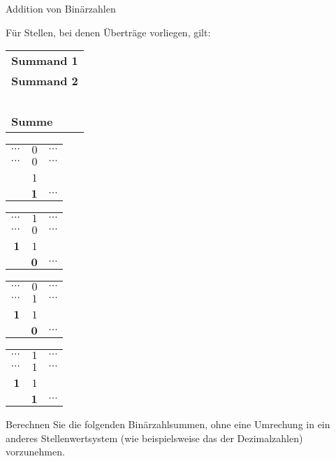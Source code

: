 \begin{exercise}{Addition von Binärzahlen}
\begin{body}
\medskip
Für Stellen, bei denen Überträge vorliegen, gilt:
\medskip
\begin{center}
\begin{tabular}{l}
\textbf{Summand 1} \\
\textbf{Summand 2} \\
{\footnotesize\ } \\
\textbf{Summe}
\end{tabular}
\hspace{2em}
\begin{tabular}{rrr}
$\dotsb$     & $0$          & $\dotsb$   \\
$\dotsb$     & $0$          & $\dotsb$   \\
{\footnotesize\ }   & {\footnotesize $1$} & {\footnotesize\ } \\
\hline
             & $\boldsymbol{1}$ & $\dotsb$
\end{tabular}
\hspace{1.5em}
\begin{tabular}{rrr}
$\dotsb$     & $1$ & $\dotsb$  \\
$\dotsb$     & $0$ & $\dotsb$  \\
{\footnotesize $\boldsymbol{1}$} & {\footnotesize $1$} & {\footnotesize\ } \\
\hline
             & $\boldsymbol{0}$ & $\dotsb$
\end{tabular}
\hspace{1.5em}
\begin{tabular}{rrr}
$\dotsb$     & $0$          & $\dotsb$  \\
$\dotsb$     & $1$          & $\dotsb$  \\
{\footnotesize $\boldsymbol{1}$} & {\footnotesize $1$} & {\footnotesize\ } \\
\hline
             & $\boldsymbol{0}$ & $\dotsb$
\end{tabular}
\hspace{1.5em}
\begin{tabular}{rrr}
$\dotsb$     & $1$ & $\dotsb$   \\
$\dotsb$     & $1$ & $\dotsb$   \\
{\footnotesize $\boldsymbol{1}$} & {\footnotesize $1$} & {\footnotesize\ } \\
\hline
             & $\boldsymbol{1}$ & $\dotsb$
\end{tabular}
\end{center}
\medskip
Berechnen Sie die folgenden Binärzahlsummen, ohne eine Umrechung in ein anderes Stellenwertsystem (wie beispielsweise das der Dezimalzahlen) vorzunehmen.

\end{body}
\end{exercise}
